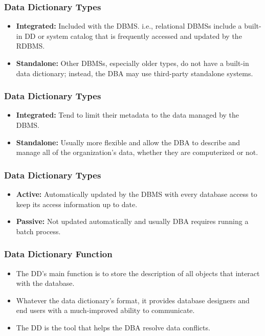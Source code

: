 \documentclass{beamer}
\begin{document}
\begin{frame}
    \frametitle{Data Dictionary Types}
    \begin{itemize}
        \item \textbf{Integrated:} Included with the DBMS. i.e., relational DBMSs include a built-in DD or system catalog that is frequently accessed and updated by the RDBMS.
        \item \textbf{Standalone:} Other DBMSs, especially older types, do not have a built-in data dictionary; instead, the DBA may use third-party standalone systems.
    \end{itemize}
\end{frame}

\begin{frame}
    \frametitle{Data Dictionary Types}
    \begin{itemize}
        \item \textbf{Integrated:} Tend to limit their metadata to the data managed by the DBMS.
        \item \textbf{Standalone:} Usually more flexible and allow the DBA to describe and manage all of the organization's data, whether they are computerized or not.
    \end{itemize}
\end{frame}

\begin{frame}
    \frametitle{Data Dictionary Types}
    \begin{itemize}
        \item \textbf{Active:} Automatically updated by the DBMS with every database access to keep its access information up to date.
        \item \textbf{Passive:} Not updated automatically and usually DBA requires running a batch process.
    \end{itemize}
\end{frame}

\begin{frame}
    \frametitle{Data Dictionary Function}
    \begin{itemize}
        \item The DD's main function is to store the description of all objects that interact with the database.
        \item Whatever the data dictionary’s format, it provides database designers and end users with a much-improved ability to communicate.
        \item The DD is the tool that helps the DBA resolve data conflicts.
    \end{itemize}
\end{frame}
\end{document}
